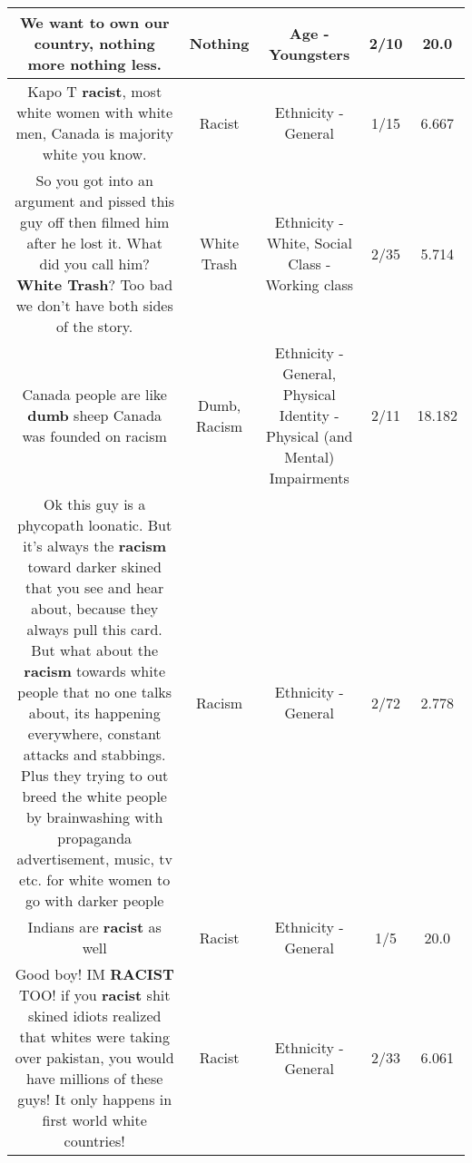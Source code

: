 \documentclass[11pt]{article}
\newlength\mylength
\begin{document}
\begin{center}
\begin{longtable}{|C{.65\mylength}|C{.30\mylength}|C{.12\mylength}|C{.12\mylength}|C{.12\mylength}|}
  \small We want to own our country, \textbf{nothing} more \textbf{nothing} less.\normalsize   & Nothing & Age - Youngsters & 2/10 & 20.0 \\  \hline
  \small Kapo T \textbf{racist}, most white women with white men, Canada is majority white you know.\normalsize   & Racist & Ethnicity - General & 1/15 & 6.667 \\  \hline
  \small So you got into an argument and pissed this guy off then filmed him after he lost it.  What did you call him? \textbf{W\textbf{hite Trash}}? Too bad we don't have both sides of the story.\normalsize   & White Trash & Ethnicity - White, Social Class - Working class & 2/35 & 5.714 \\  \hline
  \small Canada people are like \textbf{dumb} sheep Canada was founded on racism\normalsize   & Dumb, Racism & Ethnicity - General, Physical Identity - Physical (and Mental) Impairments & 2/11 & 18.182 \\  \hline
  \small Ok this guy is a phycopath loonatic. But it's always the \textbf{racism} toward darker skined that you see and hear about, because they always pull this card. But what about the \textbf{racism} towards white people that no one talks about, its happening everywhere, constant attacks and stabbings. Plus they trying to out breed the white people by brainwashing with propaganda advertisement, music, tv etc. for white women to go with darker people\normalsize   & Racism & Ethnicity - General & 2/72 & 2.778 \\  \hline
  \small Indians are \textbf{racist} as well\normalsize   & Racist & Ethnicity - General & 1/5 & 20.0 \\  \hline
  \small Good boy! IM \textbf{RACIST} TOO!  if you \textbf{racist} shit skined idiots realized that whites were taking over pakistan, you would have millions of these guys! It only happens in first world white countries!\normalsize   & Racist & Ethnicity - General & 2/33 & 6.061 \\  \hline

\end{longtable}
\end{center}
\end{document}
